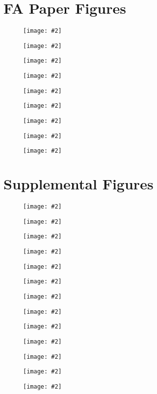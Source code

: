 \documentclass[letterpaper,12pt]{article}
\newcommand{\insertfigure}[2][1.0]{
	\begin{center}
	\begin{figure}[htbp]
	\texttt{[image: \#2]}
	\caption{}
	\end{figure}
	\end{center}
}
\begin{document}
\section*{FA Paper Figures}

\insertfigure[0.9]{../../figures/FA_workflow/graphic_workflow.png}
\insertfigure{../../figures/statics/statics}
\insertfigure[0.8]{../../figures/kinetics/kinetics}
\insertfigure{../../figures/spatial/spatial}
\insertfigure{../../figures/FAK/FAK_vs_Paxillin_dynamics}
\insertfigure{../../figures/S178A/statics_comparisons}
\insertfigure{../../figures/S178A/S178A_vs_wild-type}
\insertfigure{../../figures/lifetimes/adhesion_phase_lifetimes_alt}
\insertfigure{../../figures/S178A/sample_timecourse_no_legend}

\FloatBarrier
\section*{Supplemental Figures}
\renewcommand{\figurename}{Figure S}
\setcounter{figure}{0}

\insertfigure{../../figures/supplemental/R_squared}
\insertfigure{../../figures/FAK/FAK_vs_Paxillin_statics}
\insertfigure{../../figures/per_cell_comparisons/fluor_intensity_barplot}
\insertfigure[0.8]{../../figures/supplemental/tracking_flowchart}
\insertfigure[0.8]{../../figures/parameter_variation/comparison_assembly}
\insertfigure[0.8]{../../figures/parameter_variation/comparison_disassembly}
\insertfigure{../../figures/controls/assembly_length_variation}
\insertfigure{../../figures/controls/disassembly_length_variation}
\insertfigure{../../figures/parameter_variation/resampled_wt_slopes}
\insertfigure{../../figures/parameter_variation/resampled_S178A_slopes}
\insertfigure{../../figures/simulation/stationary_results}
\insertfigure[0.8]{../../figures/simulation/moving_results}
\insertfigure{../../figures/simulation/kinetics_results}
\end{document}
